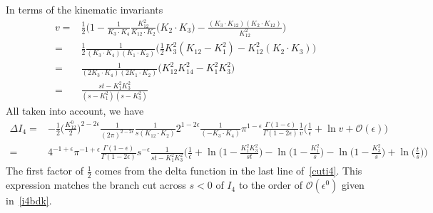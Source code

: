 In terms of the kinematic invariants
\begin{equation}
\begin{split}
v= &
\frac{1}{2}\Big( 1 - \frac{1}{K_3\cdot K_4}\frac{K_{12}^2}{K_{12}\cdot K_2}\big(K_2\cdot K_3\big) - \frac{(K_3\cdot K_{12})(K_2\cdot K_{12})}{K_{12}^2} \Big)
\\
= &
\frac{1}{2}\frac{1}{(K_3\cdot K_4)(K_1\cdot K_2)}
\Big( \frac{1}{2}K_3^2 (K_{12}- K_1^2) - K_{12}^2(K_2\cdot K_3)
\Big)
\\
=&
\frac{1}{(2K_3\cdot K_4)(2K_1\cdot K_2)}\big(K_{12}^2K_{14}^2 - K_1^2K_3^2\big)
\\
= &
\frac{st - K_1^2K_3^2}{(s-K_1^2)(s-K_3^2)}
\end{split}
\end{equation}
%
All taken into account, we have
\begin{equation}
\begin{split}
\Delta I_4 = & -\frac{1}{2}\big(\frac{K_{12}^0}{2}\big)^{2-2\epsilon}\frac{1}{(2\pi)^{2-2\epsilon}}\frac{1}{s (K_{12}\cdot K_2)}2^{1-2\epsilon}\frac{1}{(-K_3\cdot K_4)}\pi^{1-\epsilon} \frac{\Gamma(1-\epsilon)}{\Gamma(1-2\epsilon)}
\frac{1}{v}\Big(\frac{1}{\epsilon} + \ln v + \mathcal{O}(\epsilon)\Big)
\\
= & 4^{-1+\epsilon}\pi^{-1+\epsilon}\frac{\Gamma(1-\epsilon)}{\Gamma(1-2\epsilon)}s^{-\epsilon}\frac{1}{st - K_1^2K_3^2}\Big(
\frac{1}{\epsilon} + \ln\big(1-\frac{K_1^2K_3^2}{st}\big)
-\ln\big(1-\frac{K_1^2}{s}\big) - \ln\big(1-\frac{K_3^2}{s}\big) + \ln\big(\frac{t}{s}\big)\Big)
\end{split}
\end{equation}
The first factor of $\frac{1}{2}$ comes from the delta function in the last line of~\cref{cuti4}.
This expression matches the branch cut across $s < 0 $ of $I_4$ to the order of $\mathcal{O}(\epsilon^0)$ given in~\cref{i4bdk}. \\\\
